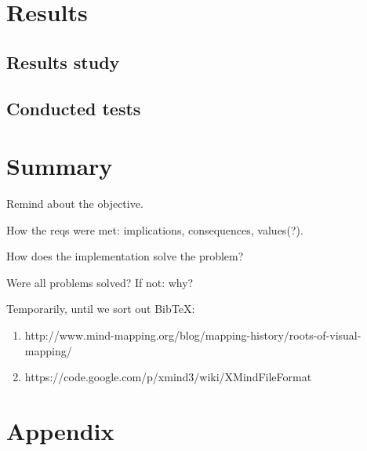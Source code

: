 \documentclass[american]{bsc}
\begin{document}
\chapter{Results}
\label{chap:results}

\section{Results study}
\label{sec:resstudy}

\section{Conducted tests}
\label{sec:tests}

\chapter{Summary}
\label{chap:summary}

Remind about the objective.

How the reqs were met: implications, consequences, values(?).

How does the implementation solve the problem?

Were all problems solved? If not: why?




Temporarily, until we sort out BibTeX:

\begin{enumerate}
	\item http://www.mind-mapping.org/blog/mapping-history/roots-of-visual-mapping/
	\item https://code.google.com/p/xmind3/wiki/XMindFileFormat
\end{enumerate}

\appendix

\chapter{Appendix}
\label{chap:appendix}
\end{document}
